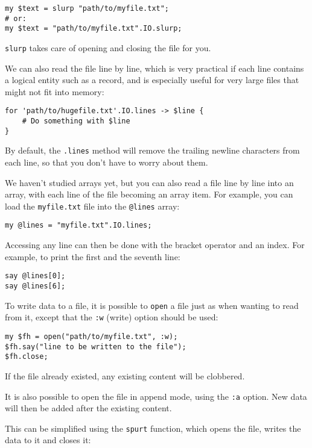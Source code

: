 \begin{verbatim}
my $text = slurp "path/to/myfile.txt";
# or:
my $text = "path/to/myfile.txt".IO.slurp;
\end{verbatim}
%

{\tt slurp} takes care of opening and closing the file for you.

We can also read the file line by line, which is very 
practical if each line contains a logical entity such as 
a record, and is especially useful for very large files 
that might not fit into memory:

\begin{verbatim}
for 'path/to/hugefile.txt'.IO.lines -> $line {
    # Do something with $line
}
\end{verbatim}
%
By default, the {\tt .lines} method will remove the trailing 
newline characters from each line, so that you don't have 
to worry about them.
%

We haven't studied arrays yet, but you can also read a file 
line by line into an array, with each line of the file 
becoming an array item. For example, you can load the 
{\tt myfile.txt} file into the \verb'@lines' array:

\begin{verbatim}
my @lines = "myfile.txt".IO.lines;
\end{verbatim}
%

Accessing any line can then be done with the bracket operator 
and an index. For example, to print the first and the 
seventh line:

\begin{verbatim}
say @lines[0];
say @lines[6];
\end{verbatim}
%
To write data to a file, it is possible to {\tt open} a file just 
as when wanting to read from it, except that the {\tt :w} (write) 
option should be used:

\begin{verbatim}
my $fh = open("path/to/myfile.txt", :w);
$fh.say("line to be written to the file");
$fh.close;
\end{verbatim}

If the file already existed, any existing content will be 
clobbered.

It is also possible to open the file in append mode, using the 
{\tt :a} option. New data will then be added after the existing 
content.

This can be simplified using the {\tt spurt} function, which 
opens the file, writes the data to it and closes it:

